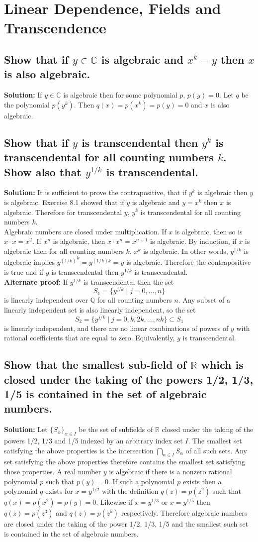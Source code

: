 \documentclass{article}
\newcommand{\exercise}[1]{\subsection{\normalfont #1}}
\newcommand{\solution}{\indent\indent \textbf{Solution: }}
\begin{document}
\section{Linear Dependence, Fields and Transcendence}
\exercise{Show that if $y\in \mathbb{C}$ is algebraic and $x^k = y$ then $x$ is also algebraic.}
\solution
If $y\in \mathbb{C}$ is algebraic then for some polynomial $p$, $p(y) = 0$. Let $q$ be the polynomial $p(y^k)$. Then $q(x)=p(x^k)=p(y)=0$ and $x$ is also algebraic.
\exercise{Show that if $y$ is transcendental then $y^k$ is transcendental for all counting numbers $k$. Show also that $y^{1/k}$ is transcendental.}
\solution
It is sufficient to prove the contrapositive, that if $y^k$ is algebraic then $y$ is algebraic. Exercise 8.1 showed that if $y$ is algebraic and $y=x^k$ then $x$ is algebraic. Therefore for transcendental $y$, $y^k$ is transcendental for all counting numbers $k$. \\
\indent Algebraic numbers are closed under multiplication. If $x$ is algebraic, then so is $x\cdot x = x^2$. If $x^n$ is algebraic, then $x\cdot x^n = x^{n+1}$ is algebraic. By induction, if $x$ is algebraic then for all counting numbers $k$, $x^k$ is algebraic. In other words, $y^{1/k}$ is algebraic implies ${y^{(1/k)}}^k = y^{(1/k)k} = y$ is algebraic. Therefore the contrapositive is true and if $y$ is transcendental then $y^{1/k}$ is transcendental.  \\
\indent \textbf{Alternate proof: }
If $y^{1/k}$ is transcendental then the set $$S_1 = \{y^{j/k} \mid j = 0, \dots, n\}$$ is linearly independent over $\mathbb{Q}$ for all counting numbers $n$. Any subset of a linearly independent set is also linearly independent, so the set $$S_2 = \{y^{j/k} \mid j = 0, k, 2k, \dots, nk\} \subset S_1$$ is linearly independent, and there are no linear combinations of powers of $y$ with rational coefficients that are equal to zero. Equivalently, $y$ is transcendental.


\exercise{Show that the smallest sub-field of $\mathbb{R}$ which is closed under the taking of the powers 1/2, 1/3, 1/5 is contained in the set of algebraic numbers.}
\solution
Let $\{S_\alpha\}_{\alpha\in I}$ be the set of subfields of $\mathbb{R}$ closed under the taking of the powers 1/2, 1/3 and 1/5 indexed by an arbitrary index set $I$. The smallest set satisfying the above properties is the intersection $\bigcap_{\alpha\in I} S_\alpha$ of all such sets. Any set satisfying the above properties therefore contains the smallest set satisfying those properties. A real number $y$ is algebraic if there is a nonzero rational polynomial $p$ such that $p(y) = 0$. If such a polynomial $p$ exists then a polynomial $q$ exists for $x = y^{1/2}$ with the definition $q(z) =  p(z^2)$ such that $q(x)=p(x^2)=p(y)=0$. Likewise if $x=y^{1/3}$ or $x=y^{1/5}$ then $q(z)=p(z^3)$ and $q(z)=p(z^5)$ respectively. Therefore algebraic numbers are closed under the taking of the power 1/2, 1/3, 1/5 and the smallest such set is contained in the set of algebraic numbers. 
\end{document}
